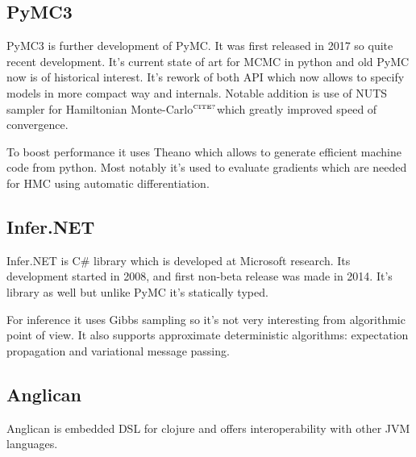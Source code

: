 \documentclass[a4paper]{article}
\newcommand{\citationneeded}{\textcolor{red}{$^{\mbox{\tiny{CITE?}}}$}}
\begin{document}
\subsection{PyMC3}
PyMC3\cite{salvatier2016pymc3} is further development of PyMC. It was first
released in 2017 so quite recent development. It's current state of art for MCMC
in python and old PyMC now is of historical interest. It's rework of both API
which now allows to specify models in more compact way and internals. Notable
addition is use of NUTS\cite{hoffman2014NUTS} sampler for Hamiltonian
Monte-Carlo\citationneeded which greatly improved speed of convergence.

To boost performance it uses
Theano\cite{bergstra2010theano}\cite{arXiv1211.5590} which allows to generate
efficient machine code from python. Most notably it's used to evaluate gradients
which are needed for HMC using automatic differentiation.


\subsection{Infer.NET}

Infer.NET\cite{InferNET14} is C\# library which is developed at Microsoft
research. Its development started in 2008, and first non-beta release was made
in 2014. It's library as well but unlike PyMC it's statically typed.

For inference it uses Gibbs sampling so it's not very interesting from
algorithmic point of view. It also supports approximate deterministic
algorithms: expectation propagation\cite{minka2001expectation} and variational
message passing\cite{winn2005variational}.

\subsection{Anglican}

Anglican\cite{tolpin2016anglican} is embedded DSL for clojure and offers
interoperability with other JVM languages.




\end{document}
